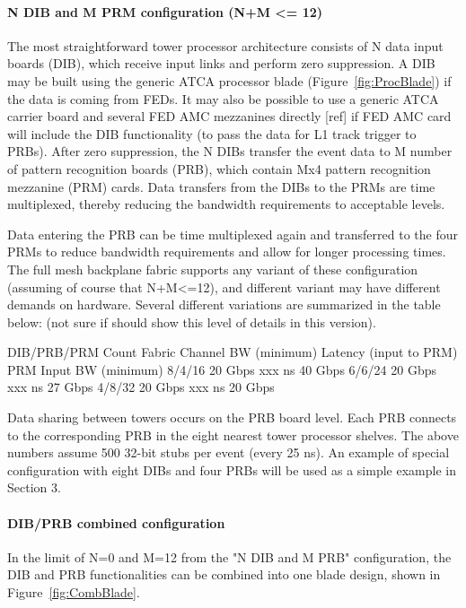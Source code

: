 \paragraph{N DIB and M PRM configuration (N+M <= 12)}

\noindent The most straightforward tower processor architecture consists of N data input boards (DIB), which receive input links and perform zero suppression.  A DIB may be built using the generic ATCA processor blade (Figure~\ref{fig:ProcBlade}) if the data is coming from FEDs.  It may also be possible to use a generic ATCA carrier board and several FED AMC mezzanines directly [ref] if FED AMC card will include the DIB functionality (to pass the data for L1 track trigger to PRBs).  After zero suppression, the N DIBs transfer the event data to M number of pattern recognition boards (PRB), which contain Mx4 pattern recognition mezzanine (PRM) cards.  Data transfers from the DIBs to the PRMs are time multiplexed, thereby reducing the bandwidth requirements to acceptable levels.  

\noindent Data entering the PRB can be time multiplexed again and transferred to the four PRMs to reduce bandwidth requirements and allow for longer processing times.  The full mesh backplane fabric supports any variant of these configuration (assuming of course that N+M<=12), and different variant may have different demands on hardware. Several different variations are summarized in the table below: (not sure if should show this level of details in this version).



 




DIB/PRB/PRM Count	Fabric Channel BW (minimum)	Latency
(input to PRM)	PRM Input BW (minimum)
8/4/16	20 Gbps	xxx ns	40 Gbps
6/6/24	20 Gbps	xxx ns	27 Gbps
4/8/32	20 Gbps	xxx ns	20 Gbps

\noindent Data sharing between towers occurs on the PRB board level.  Each PRB connects to the corresponding PRB in the eight nearest tower processor shelves.  The above numbers assume 500 32-bit stubs per event (every 25 ns).  An example of special configuration with eight DIBs and four PRBs will be used as a simple example in Section 3.

\paragraph{DIB/PRB combined configuration}

\noindent In the limit of N=0 and M=12 from the "N DIB and M PRB" configuration, the DIB and PRB functionalities can be combined into one blade design, shown in Figure~\ref{fig:CombBlade}.

